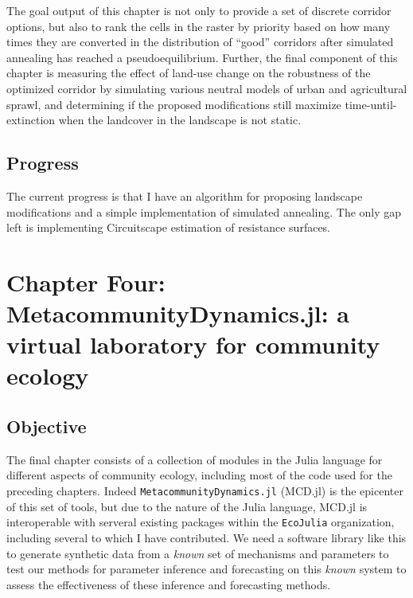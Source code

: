 \documentclass[10pt,oneside]{article}
\begin{document}
The goal output of this chapter is not only to provide a set of discrete
corridor options, but also to rank the cells in the raster by priority
based on how many times they are converted in the distribution of
``good'' corridors after simulated annealing has reached a
pseudoequilibrium. Further, the final component of this chapter is
measuring the effect of land-use change on the robustness of the
optimized corridor by simulating various neutral models of urban and
agricultural sprawl, and determining if the proposed modifications still
maximize time-until-extinction when the landcover in the landscape is
not static.

\hypertarget{progress-2}{%
\subsection{Progress}\label{progress-2}}

The current progress is that I have an algorithm for proposing landscape
modifications and a simple implementation of simulated annealing. The
only gap left is implementing Circuitscape estimation of resistance
surfaces.

\hypertarget{chapter-four-metacommunitydynamics.jl-a-virtual-laboratory-for-community-ecology}{%
\section{Chapter Four: MetacommunityDynamics.jl: a virtual laboratory
for community
ecology}\label{chapter-four-metacommunitydynamics.jl-a-virtual-laboratory-for-community-ecology}}

\hypertarget{objective-3}{%
\subsection{Objective}\label{objective-3}}

The final chapter consists of a collection of modules in the Julia
language for different aspects of community ecology, including most of
the code used for the preceding chapters. Indeed
\texttt{MetacommunityDynamics.jl} (MCD.jl) is the epicenter of this set
of tools, but due to the nature of the Julia language, MCD.jl is
interoperable with serveral existing packages within the
\texttt{EcoJulia} organization, including several to which I have
contributed. We need a software library like this to generate synthetic
data from a \emph{known} set of mechanisms and parameters to test our
methods for parameter inference and forecasting on this \emph{known}
system to assess the effectiveness of these inference and forecasting
methods.
\end{document}
